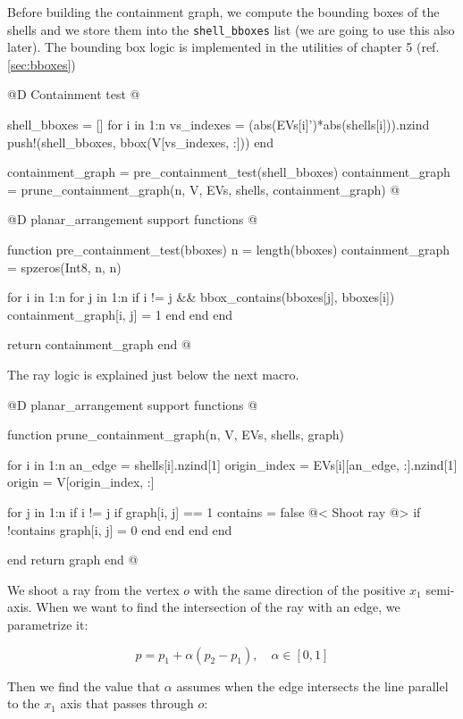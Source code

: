 Before building the containment graph, we
compute the bounding boxes of the shells and we store them into
the \texttt{shell\_bboxes} list (we are going to use this also later).
The bounding box logic is implemented in the utilities of chapter 5 
(ref. \ref{sec:bboxes})

@D Containment test
@{shell_bboxes = []
for i in 1:n
    vs_indexes = (abs(EVs[i]')*abs(shells[i])).nzind
    push!(shell_bboxes, bbox(V[vs_indexes, :]))
end

containment_graph = pre_containment_test(shell_bboxes)
containment_graph = prune_containment_graph(n, V, EVs, shells, containment_graph)
@}

@D planar\_arrangement support functions
@{function pre_containment_test(bboxes)
    n = length(bboxes)
    containment_graph = spzeros(Int8, n, n)

    for i in 1:n
        for j in 1:n
            if i != j && bbox_contains(bboxes[j], bboxes[i])
                containment_graph[i, j] = 1
            end
        end
    end

    return containment_graph
end
@}

The ray logic is explained just below the next macro.

@D planar\_arrangement support functions
@{function prune_containment_graph(n, V, EVs, shells, graph)
    
    for i in 1:n
        an_edge = shells[i].nzind[1]
        origin_index = EVs[i][an_edge, :].nzind[1]
        origin = V[origin_index, :]
 
        for j in 1:n
            if i != j
                if graph[i, j] == 1
                    contains = false
                    @< Shoot ray @>
                    if !contains
                        graph[i, j] = 0
                    end
                end
             end
         end

     end
     return graph
end
@}

We shoot a ray from the vertex $o$ with the same direction
of the positive $x_1$ semi-axis.
When we want to find the intersection of the ray with an edge,
we parametrize it:

\begin{equation}
\label{eq:edge}
    p = p_1 + \alpha(p_2-p_1), \quad\alpha\in[0, 1]
\end{equation}

Then we find the value that $\alpha$ assumes when the edge
intersects the line parallel to the $x_1$ axis that passes through $o$:

